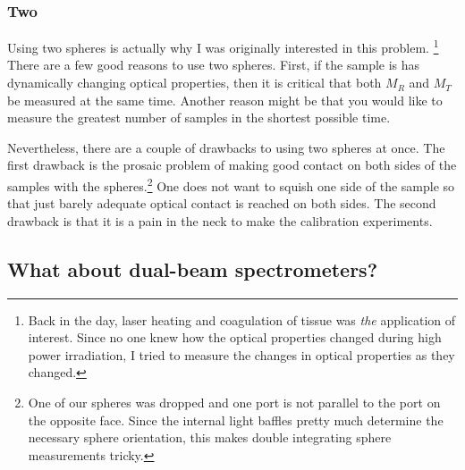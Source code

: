 \documentclass{article}
\begin{document}
\subsubsection{Two}

Using two spheres is actually why I was originally interested in this problem.%
\footnote{Back in the day, laser heating and coagulation of tissue was
\textit{the} application of interest.  Since no one knew how the optical properties
changed during high power irradiation, I tried to measure the changes in optical
properties as they changed.}
There are a few good reasons to use two spheres.  First, if the
sample is has dynamically changing optical properties, then it is critical
that both $M_R$ and $M_T$ be measured at the same time.  Another reason 
might be that you would like to measure the greatest number of samples in
the shortest possible time.  

Nevertheless, there are a couple of drawbacks to using two spheres at once.
The first drawback is the prosaic problem of making good contact on both sides of
the samples with the spheres.\footnote{One of our spheres was dropped and
one port is not parallel to the port on the opposite face.  Since the internal
light baffles pretty much determine the necessary sphere orientation, this makes
double integrating sphere measurements tricky.}
One does not want to squish one side of the sample so that just barely adequate
optical contact is reached on both sides.  The second drawback is that it is
a pain in the neck to make the calibration experiments.  

\subsection{What about dual-beam spectrometers?}
\end{document}
